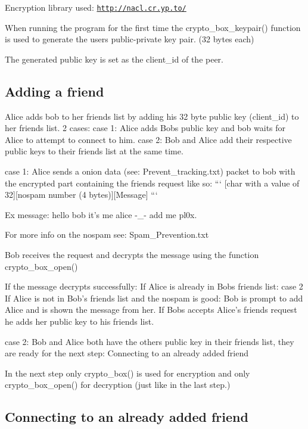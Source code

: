 Encryption library used\+: \href{http://nacl.cr.yp.to/}{\tt http\+://nacl.\+cr.\+yp.\+to/}

When running the program for the first time the crypto\+\_\+box\+\_\+keypair() function is used to generate the users public-\/private key pair. (32 bytes each)

The generated public key is set as the client\+\_\+id of the peer.

\subsection*{Adding a friend }

Alice adds bob to her friends list by adding his 32 byte public key (client\+\_\+id) to her friends list. 2 cases\+: case 1\+: Alice adds Bobs public key and bob waits for Alice to attempt to connect to him. case 2\+: Bob and Alice add their respective public keys to their friends list at the same time.

case 1\+: Alice sends a onion data (see\+: Prevent\+\_\+tracking.\+txt) packet to bob with the encrypted part containing the friends request like so\+: ``` \mbox{[}char with a value of 32\mbox{]}\mbox{[}nospam number (4 bytes)\mbox{]}\mbox{[}Message\mbox{]} ```

Ex message\+: hello bob it's me alice -\/\+\_\+-\/ add me pl0x.

For more info on the nospam see\+: Spam\+\_\+\+Prevention.\+txt

Bob receives the request and decrypts the message using the function crypto\+\_\+box\+\_\+open()

If the message decrypts successfully\+: If Alice is already in Bobs friends list\+: case 2 If Alice is not in Bob's friends list and the nospam is good\+: Bob is prompt to add Alice and is shown the message from her. If Bobs accepts Alice's friends request he adds her public key to his friends list.

case 2\+: Bob and Alice both have the others public key in their friends list, they are ready for the next step\+: Connecting to an already added friend

In the next step only crypto\+\_\+box() is used for encryption and only crypto\+\_\+box\+\_\+open() for decryption (just like in the last step.)

\subsection*{Connecting to an already added friend }

